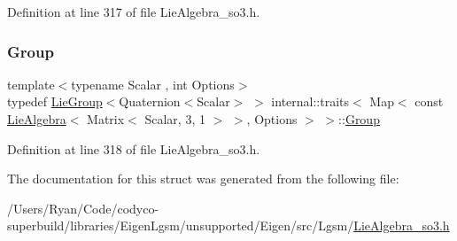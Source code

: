 Definition at line 317 of file Lie\+Algebra\+\_\+so3.\+h.

\hypertarget{structinternal_1_1traits_3_01_map_3_01const_01_lie_algebra_3_01_matrix_3_01_scalar_00_013_00_011480673ebb2de2c070cfdb8edee3d7437_acdfb59027e942e113b4f8ad4defe78e0}{}\label{structinternal_1_1traits_3_01_map_3_01const_01_lie_algebra_3_01_matrix_3_01_scalar_00_013_00_011480673ebb2de2c070cfdb8edee3d7437_acdfb59027e942e113b4f8ad4defe78e0} 
\subsubsection{\texorpdfstring{Group}{Group}}
{\footnotesize\ttfamily template$<$typename Scalar , int Options$>$ \\
typedef \hyperlink{class_lie_group}{Lie\+Group}$<$Quaternion$<$Scalar$>$ $>$ internal\+::traits$<$ Map$<$ const \hyperlink{class_lie_algebra}{Lie\+Algebra}$<$ Matrix$<$ Scalar, 3, 1 $>$ $>$, Options $>$ $>$\+::\hyperlink{structinternal_1_1traits_3_01_map_3_01const_01_lie_algebra_3_01_matrix_3_01_scalar_00_013_00_011480673ebb2de2c070cfdb8edee3d7437_acdfb59027e942e113b4f8ad4defe78e0}{Group}}



Definition at line 318 of file Lie\+Algebra\+\_\+so3.\+h.



The documentation for this struct was generated from the following file\+:\begin{DoxyCompactItemize}
\item 
/\+Users/\+Ryan/\+Code/codyco-\/superbuild/libraries/\+Eigen\+Lgsm/unsupported/\+Eigen/src/\+Lgsm/\hyperlink{_lie_algebra__so3_8h}{Lie\+Algebra\+\_\+so3.\+h}\end{DoxyCompactItemize}
